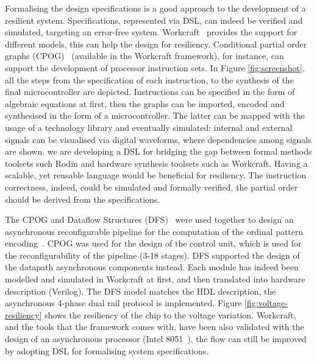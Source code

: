 \documentclass[conference]{IEEEtran}
\begin{document}
Formalising the design specifications is a good approach to the development of a resilient
system. Specifications, represented via DSL, can indeed be verified and
simulated, targeting an error-free system. Workcraft~\cite{workcraft_web} provides the support for different
models, this can help the design for resiliency. Conditional partial order graphs (CPOG)~\cite{CPOG}
(available in the Workcraft framework), for instance, can support the development of
processor instruction sets. In Figure \ref{fig:screenshot}, all the steps from the
specification of each instruction, to the synthesis of the final microcontroller are
depicted. Instructions can be specified in the form of algebraic equations at first, then the
graphs can be imported, encoded and synthesised in the form of a microcontroller. The latter
can be mapped with the usage of a technology library and eventually simulated: internal and
external signals can be visualised via digital waveforms, where dependencies among signals
are shown. we are developing a DSL for bridging the gap between formal methods toolsets such
Rodin and hardware synthesis toolsets such as Workcraft. Having a scalable, yet
reusable language would be beneficial for resiliency. The instruction correctness, indeed,
could be simulated and formally verified, the partial order should be derived from the
specifications.

The CPOG and Dataflow Structures (DFS)~\cite{DFS} were used together to design an asynchronous
reconfigurable pipeline for the computation of the ordinal pattern encoding~\cite{OPE}. CPOG was used
for the design of the control unit, which is used for the reconfigurability of the pipeline
(3-18 stages). DFS supported the design of the datapath asynchronous components instead. Each
module has indeed been modelled and simulated in Workcraft at first, and then translated into
hardware description (Verilog). The DFS model matches the HDL description, the asynchronous
4-phase dual rail protocol is implemented. Figure \ref{fig:voltage-resiliency} shows the
resiliency of the chip to the voltage variation. Workcraft, and the tools that the framework
comes with, have been also validated with the design of an asynchronous processor (Intel
8051~\cite{rec-proc}), the flow can still be improved by adopting DSL for formalising system
specifications.
\end{document}
